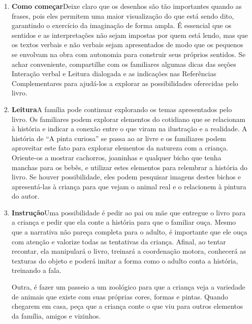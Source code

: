 \documentclass[11pt]{extarticle}
\begin{document}
\begin{enumerate}
\item \textbf{Como começar}\quad Deixe claro que os desenhos são tão importantes 
quando as frases, pois eles
permitem uma maior visualização do que está sendo dito, garantindo o exercício
da imaginação de forma ampla. 
É essencial que os sentidos e as interpretações não sejam impostas por quem está lendo,
mas que os textos verbais e não verbais sejam apresentados de modo que os pequenos
se envolvam na obra com autonomia para construir seus próprios sentidos.
Se achar conveniente, compartilhe com 
os familiares algumas dicas das seções Interação verbal 
e Leitura dialogada e as indicações nas Referências Complementares 
para ajudá-los a explorar as possibilidades oferecidas pelo livro. 

\item \textbf{Leitura}\quad A família pode continuar 
explorando os temas apresentados pelo livro. Os familiares podem explorar 
elementos do cotidiano que se relacionam à história e indicar a conexão 
entre o que viram na ilustração e a realidade. A história de “A pinta curiosa” 
se passa ao ar livre e os familiares podem aproveitar este fato 
para explorar elementos da natureza com a criança. Oriente-os a mostrar 
cachorros, joaninhas e qualquer bicho que tenha manchas para os bebês, e utilizar estes elementos para 
relembrar a história do livro. Se houver possibilidade, eles podem pesquisar 
imagens destes bichos e apresentá-las à criança para que vejam o animal 
real e o relacionem à pintura do autor. 

\item \textbf{Instrução}\quad Uma possibilidade é pedir ao pai ou mãe  
que entregue o livro para a criança e pedir que ela conte 
a história para que o familiar ouça. Mesmo que a narrativa não pareça 
completa para o adulto, é importante que ele ouça com atenção e 
valorize todas as tentativas da criança. Afinal, ao tentar recontar, 
ela manipulará o livro, treinará a coordenação motora, conhecerá as texturas 
do objeto e poderá imitar a forma como o adulto 
conta a história, treinando a fala. 

Outra, é fazer um passeio a um zoológico para que a criança veja a variedade 
de animais que existe com suas próprias cores, formas e pintas. 
Quando chegarem em casa, peça que a criança conte o que viu para 
outros elementos da família, amigos e vizinhos. 

\end{enumerate}
\end{document}
